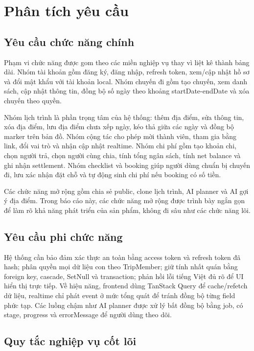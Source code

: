 \documentclass[a4paper]{report}
\begin{document}
\section{Phân tích yêu cầu}

\subsection{Yêu cầu chức năng chính}

Phạm vi chức năng được gom theo các miền nghiệp vụ thay vì liệt kê thành bảng dài. Nhóm tài khoản gồm đăng ký, đăng nhập, refresh token, xem/cập nhật hồ sơ và đổi mật khẩu với tài khoản local. Nhóm chuyến đi gồm tạo chuyến, xem danh sách, cập nhật thông tin, đồng bộ số ngày theo khoảng startDate-endDate và xóa chuyến theo quyền.

Nhóm lịch trình là phần trọng tâm của hệ thống: thêm địa điểm, sửa thông tin, xóa địa điểm, lưu địa điểm chưa xếp ngày, kéo thả giữa các ngày và đồng bộ marker trên bản đồ. Nhóm cộng tác cho phép mời thành viên, tham gia bằng link, đổi vai trò và nhận cập nhật realtime. Nhóm chi phí gồm tạo khoản chi, chọn người trả, chọn người cùng chia, tính tổng ngân sách, tính net balance và ghi nhận settlement. Nhóm checklist và booking giúp người dùng chuẩn bị chuyến đi, lưu xác nhận đặt chỗ và tự động sinh chi phí nếu booking có số tiền.

Các chức năng mở rộng gồm chia sẻ public, clone lịch trình, AI planner và AI gợi ý địa điểm. Trong báo cáo này, các chức năng mở rộng được trình bày ngắn gọn để làm rõ khả năng phát triển của sản phẩm, không đi sâu như các chức năng lõi.

\subsection{Yêu cầu phi chức năng}

Hệ thống cần bảo đảm xác thực an toàn bằng access token và refresh token đã hash; phân quyền mọi dữ liệu con theo TripMember; giữ tính nhất quán bằng foreign key, cascade, SetNull và transaction; phản hồi lỗi tiếng Việt đủ rõ để UI hiển thị trực tiếp. Về hiệu năng, frontend dùng TanStack Query để cache/refetch dữ liệu, realtime chỉ phát event ở mức tổng quát để tránh đồng bộ từng field phức tạp. Các luồng chậm như AI planner được xử lý bất đồng bộ bằng job, có stage, progress và errorMessage để người dùng theo dõi.

\subsection{Quy tắc nghiệp vụ cốt lõi}
\end{document}
